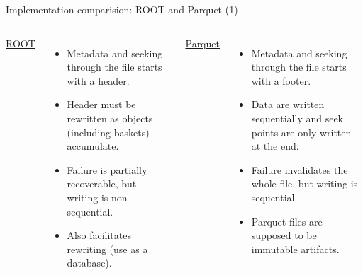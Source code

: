 \documentclass[aspectratio=169]{beamer}
\begin{document}
\begin{frame}{Implementation comparision: ROOT and Parquet (1)}
\vspace{0.5 cm}
\begin{columns}[t]
{\large \underline{ROOT}}

\begin{itemize}
\item Metadata and seeking through the file starts with a header.

\item Header must be rewritten as objects (including baskets) accumulate.

\item Failure is partially recoverable, but writing is non-sequential.

\item Also facilitates rewriting (use as a database).
\end{itemize}

{\large \underline{Parquet}}

\begin{itemize}
\item Metadata and seeking through the file starts with a footer.

\item Data are written sequentially and seek points are only written at the end.

\item Failure invalidates the whole file, but writing is sequential.

\item Parquet files are supposed to be immutable artifacts.
\end{itemize}
\end{columns}
\end{frame}
\end{document}
